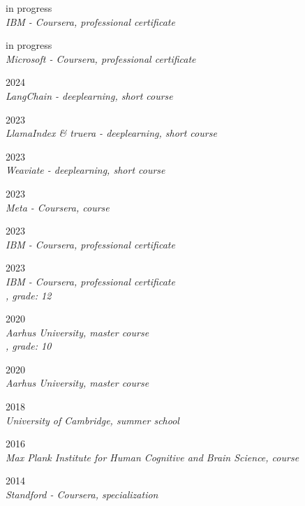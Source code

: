 

\strut \hfill in progress\\
\textit{IBM - Coursera, professional certificate}\\

\strut \hfill in progress\\
\textit{Microsoft - Coursera, professional certificate}\\

\strut \hfill 2024\\
\textit{LangChain - deeplearning, short course}\\

\strut \hfill 2023\\
\textit{LlamaIndex \& truera - deeplearning, short course}\\

\strut \hfill 2023\\
\textit{Weaviate - deeplearning, short course}\\

\strut \hfill 2023\\
\textit{Meta - Coursera, course}\\

\strut \hfill 2023\\
\textit{IBM - Coursera, professional certificate}\\

\strut \hfill 2023\\
\textit{IBM - Coursera, professional certificate}\\

\textit{, grade: 12}\strut \hfill 2020\\
\textit{Aarhus University, master course}\\

\textit{, grade: 10}\strut \hfill 2020\\
\textit{Aarhus University, master course}\\

\strut \hfill 2018\\
\textit{University of Cambridge, summer school}\\

\strut \hfill 2016\\
\textit{Max Plank Institute for Human Cognitive and Brain Science, course}\\

\strut \hfill 2014\\
\textit{Standford - Coursera, specialization}\\


